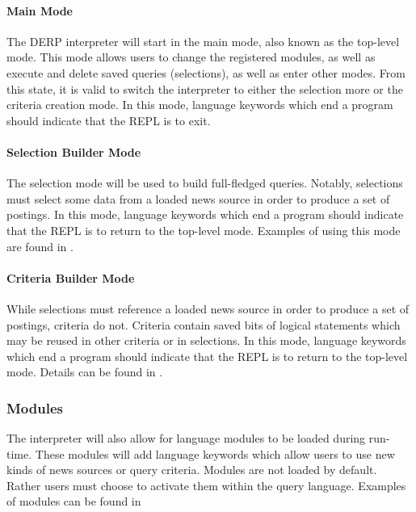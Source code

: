\paragraph{Main Mode}

The DERP interpreter will start in the main mode, also known as the top-level mode. This mode allows users to change the registered modules, as well as execute and delete saved queries (selections), as well as enter other modes. From this state, it is valid to switch the interpreter to either the selection more or the criteria creation mode. In this mode, language keywords which end a program should indicate that the REPL is to exit.

\paragraph{Selection Builder Mode}

The selection mode will be used to build full-fledged queries. Notably, selections must select some data from a loaded news source in order to produce a set of postings. In this mode, language keywords which end a program should indicate that the REPL is to return to the top-level mode. Examples of using this mode are found in . 

\paragraph{Criteria Builder Mode}

While selections must reference a loaded news source in order to produce a set of postings, criteria do not. Criteria contain saved bits of logical statements which may be reused in other criteria or in selections. In this mode, language keywords which end a program should indicate that the REPL is to return to the top-level mode. Details can be found in .


\subsubsection{Modules}

The interpreter will also allow for language modules to be loaded during run-time. These modules will add language keywords which allow users to use new kinds of news sources or query criteria. Modules are not loaded by default. Rather users must choose to activate them within the query language. Examples of modules can be found in 


